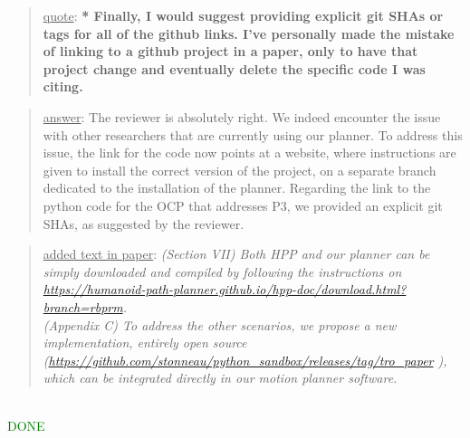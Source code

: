 \documentclass[a4paper]{article}
\newcommand{\done}[0]{\textcolor{green}{DONE}}
\newcommand\quot[1]{\begin{quote} \underline{quote}: \textbf{#1}\end{quote}}
\newcommand\as[1]{\begin{quote} \underline{answer}: {#1}\end{quote} }
\newcommand\qt[1]{\begin{quote} \underline{added text in paper}: \textit{#1}\end{quote} \leavevmode \\ }
\begin{document}
\quot{* Finally, I would suggest providing explicit git SHAs or tags for all
of the github links. I've personally made the mistake of linking to a
github project in a paper, only to have that project change and
eventually delete the specific code I was citing. }
\as{The reviewer is absolutely right. We indeed encounter the issue with other researchers that are currently using our planner. 
To address this issue, the link for the code now points at a website, where instructions are given to install the correct version of the project, on a separate branch
dedicated to the installation of the planner.
Regarding the link to the python code for the OCP that addresses P3, we provided an explicit git SHAs, as suggested by the reviewer.}
\qt{(Section VII) Both HPP and our planner can be simply downloaded and compiled by following the instructions on
\url{https://humanoid-path-planner.github.io/hpp-doc/download.html?branch=rbprm}. \\
(Appendix C) To address the other scenarios, we propose a new implementation, entirely open source (\url{https://github.com/stonneau/python_sandbox/releases/tag/tro_paper} ), which can be integrated directly in our motion planner software. }
\done
\end{document}
